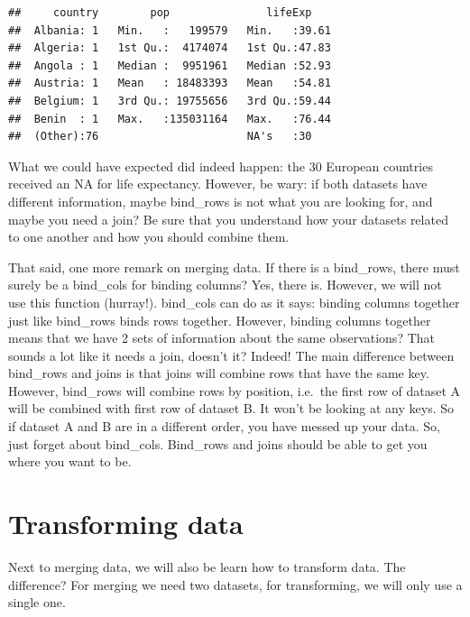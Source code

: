 \documentclass[]{tufte-book}
\newenvironment{Shaded}{}{}
\newcommand{\KeywordTok}[1]{\textcolor[rgb]{0.00,0.44,0.13}{\textbf{#1}}}
\newcommand{\NormalTok}[1]{#1}
\newcommand{\OperatorTok}[1]{\textcolor[rgb]{0.40,0.40,0.40}{#1}}
\newcommand{\StringTok}[1]{\textcolor[rgb]{0.25,0.44,0.63}{#1}}
\begin{document}
\begin{Shaded}
\end{Shaded}

\begin{verbatim}
##     country        pop               lifeExp     
##  Albania: 1   Min.   :   199579   Min.   :39.61  
##  Algeria: 1   1st Qu.:  4174074   1st Qu.:47.83  
##  Angola : 1   Median :  9951961   Median :52.93  
##  Austria: 1   Mean   : 18483393   Mean   :54.81  
##  Belgium: 1   3rd Qu.: 19755656   3rd Qu.:59.44  
##  Benin  : 1   Max.   :135031164   Max.   :76.44  
##  (Other):76                       NA's   :30
\end{verbatim}

What we could have expected did indeed happen: the 30 European countries received an NA for life expectancy. However, be wary: if both datasets have different information, maybe bind\_rows is not what you are looking for, and maybe you need a join? Be sure that you understand how your datasets related to one another and how you should combine them.

That said, one more remark on merging data. If there is a bind\_rows, there must surely be a bind\_cols for binding columns? Yes, there is. However, we will not use this function (hurray!). bind\_cols can do as it says: binding columns together just like bind\_rows binds rows together. However, binding columns together means that we have 2 sets of information about the same observations? That sounds a lot like it needs a join, doesn't it? Indeed! The main difference between bind\_rows and joins is that joins will combine rows that have the same key. However, bind\_rows will combine rows by position, i.e.~the first row of dataset A will be combined with first row of dataset B. It won't be looking at any keys. So if dataset A and B are in a different order, you have messed up your data. So, just forget about bind\_cols. Bind\_rows and joins should be able to get you where you want to be.

\hypertarget{transforming-data-1}{%
\section{Transforming data}\label{transforming-data-1}}

Next to merging data, we will also be learn how to transform data. The difference? For merging we need two datasets, for transforming, we will only use a single one.
\end{document}
